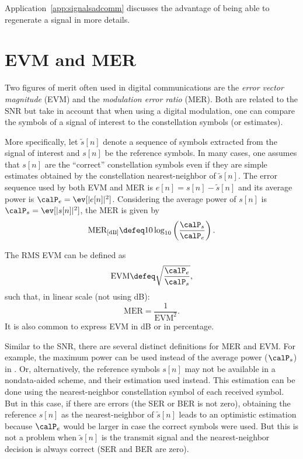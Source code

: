Application~\ref{app:signalsadcomm} discusses the advantage of being able to regenerate a signal in more details.




\section{EVM and MER}
Two figures of merit often used in digital communications are the \emph{error vector magnitude} (EVM) and the \emph{modulation error ratio} (MER). Both are related to the SNR but take in account
that when using a digital modulation, one can compare the symbols of a signal of interest
to the constellation symbols (or estimates).

More specifically, let $\tilde s[n]$ denote a sequence of symbols extracted from the signal of
interest and $s[n]$ be the reference symbols. In many cases, one assumes that
$s[n]$ are the ``correct'' constellation symbols even if they are simple estimates
obtained by the constellation nearest-neighbor of $\tilde s[n]$. The error sequence used by
both EVM and MER is $e[n] = s[n] - \tilde s[n]$ and its average power is $\calP_e = \ev[|e[n]|^2]$. Considering the average power of $s[n]$ is $\calP_s = \ev[|s[n]|^2]$, the MER is given by
\begin{equation}
\textrm{MER}_{[\textrm{dB}]}  \defeq 10 \log_{10} \left(\frac{\calP_s}{\calP_e}\right).
\label{eq:mer}
\end{equation}

The RMS EVM can be defined as
\begin{equation}
\textrm{EVM}  \defeq \sqrt{\frac{\calP_e}{\calP_s}},
\label{eq:evm}
\end{equation}
such that, in linear scale (not using dB):
\begin{equation}
\textrm{MER}  = \frac{1}{\textrm{EVM}^2}.
\label{eq:mer_and_evm}
\end{equation}
It is also common to express EVM in dB or in percentage.

Similar to the SNR, there are several distinct definitions for MER and EVM. 
For example, the maximum power can be used instead of the average power ($\calP_s$) in .
Or, alternatively, the reference symbols $s[n]$ may not be available in a nondata-aided scheme, and
their estimation used instead. This estimation can be done using the nearest-neighbor 
constellation symbol of each received symbol. But in this case, if there are errors
(the SER or BER is not zero), obtaining
the reference $s[n]$ as the nearest-neighbor of $\tilde s[n]$ leads to an optimistic
estimation because $\calP_e$ would be larger in case the correct symbols were used. 
But this is not a problem when $\tilde s[n]$ is the transmit signal and the
nearest-neighbor decision is always correct (SER and BER are zero).


